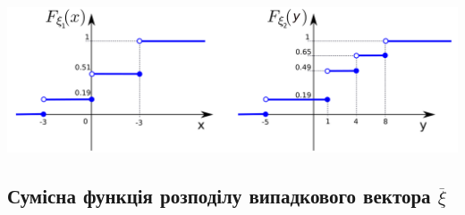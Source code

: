 \documentclass[14pt,a4paper]{scrartcl}
\theoremstyle{definition}
\theoremstyle{remark}
\theoremstyle{definition}
\theoremstyle{definition}
\begin{document}
\begin{center} \includegraphics[scale=0.34]{assets/6.png} \end{center}

\def\Fx{F_{\overline{\xi}}}
\subsection{Сумісна функція розподілу випадкового вектора $\overline{\xi}$}
\end{document}
